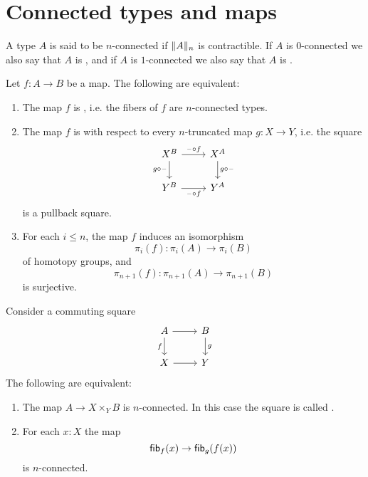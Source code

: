 
\chapter{Connected types and maps}

\begin{defn}
A type $A$ is said to be $n$-connected if $\trunc{n}{A}$ is contractible.
If $A$ is $0$-connected we also say that $A$ is ,
and if $A$ is $1$-connected we also say that $A$ is .
\end{defn}

\begin{thm}
Let $f:A\to B$ be a map. The following are equivalent:
\begin{enumerate}
\item The map $f$ is , i.e. the fibers of $f$ are $n$-connected types.
\item The map $f$ is  with respect to every $n$-truncated map $g:X\to Y$, i.e. the square
\begin{equation*}
\begin{tikzcd}
X^B \arrow[r,"\blank\circ f"] \arrow[d,swap,"g\circ \blank"] & X^A \arrow[d,"g\circ\blank"] \\
Y^B \arrow[r,swap,"\blank\circ f"] & Y^A
\end{tikzcd}
\end{equation*}
is a pullback square.
\item For each $i\leq n$, the map $f$ induces an isomorphism
\begin{equation*}
\pi_i(f):\pi_i(A)\to\pi_i(B)
\end{equation*}
of homotopy groups, and 
\begin{equation*}
\pi_{n+1}(f):\pi_{n+1}(A)\to\pi_{n+1}(B)
\end{equation*}
is surjective.
\end{enumerate}
\end{thm}

\begin{thm}
Consider a commuting square
\begin{equation*}
\begin{tikzcd}
A \arrow[d,swap,"f"] \arrow[r] & B \arrow[d,"g"] \\
X \arrow[r] & Y
\end{tikzcd}
\end{equation*}
The following are equivalent:
\begin{enumerate}
\item The map $A\to X\times_Y B$ is $n$-connected. In this case the square is called .
\item For each $x:X$ the map
\begin{equation*}
\fib{f}{x}\to \fib{g}{f(x)}
\end{equation*}
is $n$-connected.
\end{enumerate}
\end{thm}


